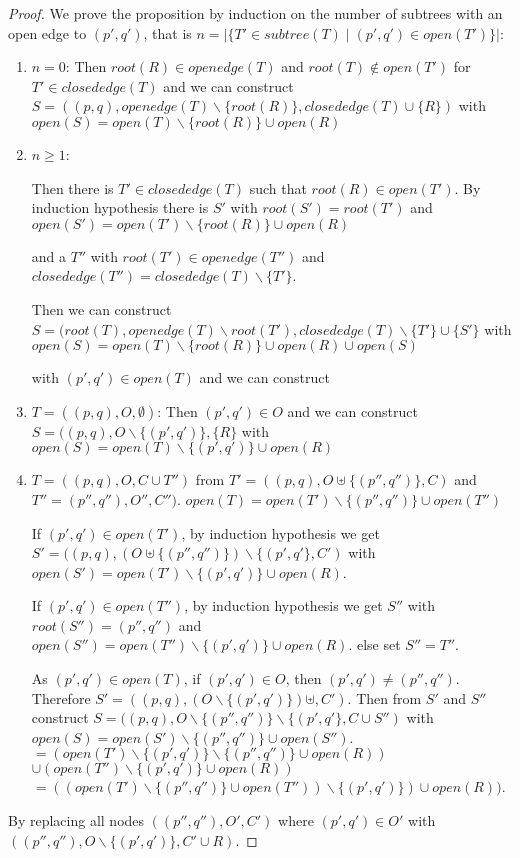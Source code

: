\begin{proof}
  We prove the proposition by induction on the number of subtrees
  with an open edge to $(p',q')$, that is
  $n = |\{T' ∈ subtree(T) \mid (p',q') ∈ open(T') \}|$:
  \begin{enumerate}
    \item $n = 0$:
      Then
      $root(R) ∈ openedge(T)$ and $root(T) ∉ open(T')$ for $T' ∈ closededge(T)$
      and we can construct
      $S = ((p,q), openedge(T) ∖ \{root(R)\}, closededge(T) ∪ \{R\})$ with
      $open(S) = open(T) ∖ \{root(R)\} ∪ open(R)$
    \item $n ≥ 1$:
      
      Then there is $T' ∈ closededge(T)$ such that $root(R) ∈ open(T')$.
      By induction hypothesis there is
      $S'$ with $root(S') = root(T')$ and
      $open(S') = open(T') ∖ \{root(R)\} ∪ open(R)$
      
      and a $T''$ with $root(T') ∈ openedge(T'')$ and
      $closededge(T'') = closededge(T) ∖ \{T'\}$.

      Then we can construct
      $S = (root(T), openedge(T) ∖ root(T'), closededge(T) ∖ \{T'\} ∪ \{S'\}$
      with
      $open(S) = open(T) ∖ \{root(R)\} ∪ open(R) ∪ open(S)$

      with $(p',q') ∈ open(T)$ and we can construct
    \item $T = ((p,q), O, ∅)$:
      Then $(p',q') ∈ O$ and we can construct
      $S = ((p,q), O ∖ \{(p',q')\}, \{R\}$ with
      $open(S) = open(T) ∖ \{(p', q')\} ∪ open(R)$
    \item $T = ((p,q), O, C ∪ T'')$ from
        $T' = ((p,q), O \uplus \{(p'',q'')\}, C)$ and
        $T'' = (p'',q''), O'', C'')$.
        $open(T) = open(T') ∖ \{(p'',q'')\} ∪ open(T'')$

        If $(p',q') ∈ open(T')$, by induction hypothesis we get
        $S' = ((p,q), (O \uplus \{(p'',q'')\}) ∖ \{(p', q'\}, C')$ with
        $open(S') = open(T') ∖ \{(p', q')\} ∪ open(R)$.
        
        If $(p',q') ∈ open(T'')$, by induction hypothesis we get
        $S''$ with $root(S'') = (p'',q'')$ and
        $open(S'') = open(T'') ∖ \{(p', q')\} ∪ open(R)$.
        else set $S'' = T''$.
        
        As $(p',q') ∈ open(T)$, if $(p',q') ∈ O$, then $(p',q') ≠ (p'',q'')$. Therefore
        $S' = ((p,q), (O ∖ \{(p', q')\}) \uplus, C')$.
        Then from $S'$ and $S''$ construct
        $S = ((p,q), O ∖ \{(p'',q'')\} ∖ \{(p', q'\} , C ∪ S'')$ with
        $open(S) = open(S') ∖ \{(p'', q'')\} ∪ open(S'')$.
        $= (open(T') ∖ \{(p', q')\} ∖ \{(p'',q'')\}  ∪ open(R))$
        $∪ (open(T'') ∖ \{(p', q')\} ∪ open(R))$
        $= ((open(T') ∖ \{(p'',q'')\} ∪ open(T'')) ∖ \{(p', q')\}) ∪ open(R))$.
  \end{enumerate}
  By replacing all nodes $((p'',q''), O', C')$ where
  $(p',q') ∈ O'$ with $((p'',q''), O ∖ \{(p', q')\}, C' ∪ R)$.
\end{proof}

